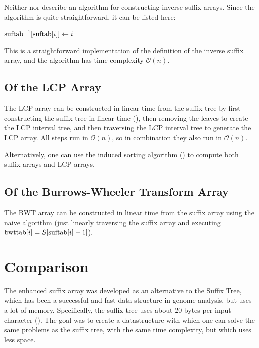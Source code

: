 \documentclass[a4paper,10pt]{article}
\begin{document}
Neither \citealt{abouelhoda2004replacing} nor
\citealt{abouelhoda2002enhanced} describe an algorithm for constructing
inverse suffix arrays. Since the algorithm is quite straightforward,
it can be listed here:

\begin{algorithmic}
	\State $\hbox{suftab}^{-1}[\hbox{suftab}[i]] \gets i$
\EndFor
\end{algorithmic}

This is a straightforward implementation of the definition of the inverse
suffix array, and the algorithm has time complexity $\mathcal{O}(n)$.

\subsection*{Of the LCP Array}

The LCP array can be constructed in linear time from the
suffix tree by first constructing the suffix tree in linear time
(\cite{giegerich1997ukkonen}), then removing the leaves to create the
LCP interval tree, and then traversing the LCP interval tree to generate
the LCP array. All steps run in $\mathcal{O}(n)$, so in combination they
also run in $\mathcal{O}(n)$.

Alternatively, one can use the induced sorting algorithm
(\cite{fischer2011inducing}) to compute both suffix arrays and LCP-arrays.

\subsection*{Of the Burrows-Wheeler Transform Array}

The BWT array can be constructed in linear time from the suffix array
using the naive algorithm (just linearly traversing the suffix array
and executing $\hbox{bwttab}[i]=S[\hbox{suftab}[i]-1]$).

\section*{Comparison}

The enhanced suffix array was developed as an alternative to the Suffix
Tree, which has been a successful and fast data structure in genome
analysis, but uses a lot of memory. Specifically, the suffix tree uses
about 20 bytes per input character (\cite{kurtz1999reducing}). The
goal was to create a datastructure with which one can solve the same
problems as the suffix tree, with the same time complexity, but which
uses less space.
\end{document}
